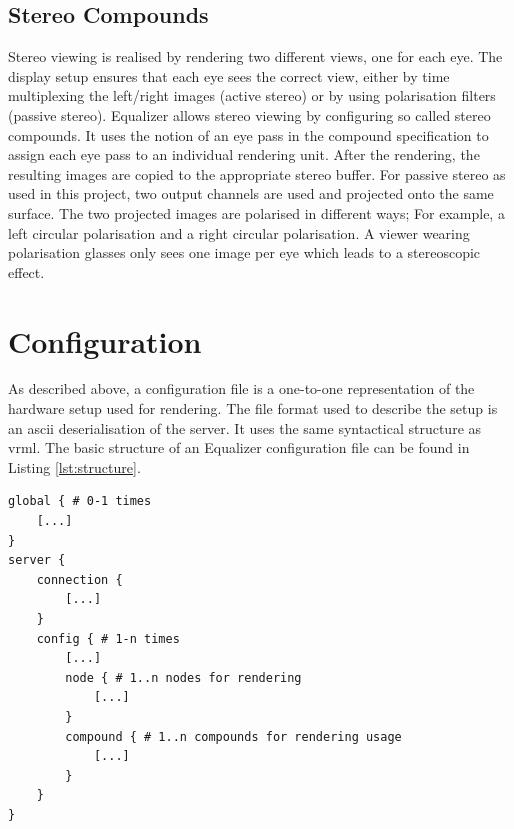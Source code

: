 \subsection{Stereo Compounds}
Stereo viewing is realised by rendering two different views, one for each eye. The display setup ensures that each eye sees the correct view, either by time multiplexing the left/right images (active stereo) or by using polarisation filters (passive stereo). Equalizer allows stereo viewing by configuring so called stereo compounds. It uses the notion of an eye pass in the compound specification to assign each eye pass to an individual rendering unit. After the rendering, the resulting images are copied to the appropriate stereo buffer.
For passive stereo as used in this project, two output channels are used and projected onto the same surface. The two projected images are polarised in different ways; For example, a left circular polarisation and a right circular polarisation. A viewer wearing polarisation glasses only sees one image per eye which leads to a stereoscopic effect.

\section{Configuration}
As described above, a configuration file is a one-to-one representation of the hardware setup used for rendering. The file format used to describe the setup is an \gls{ascii} deserialisation of the server. It uses the same syntactical structure as \gls{vrml}. The basic structure of an Equalizer configuration file can be found in Listing \ref{lst:structure}.

\begin{lstlisting}[language=vrml,caption={Basic structure of Equalizer configuration files},label={lst:structure}]
global { # 0-1 times
	[...]
}
server { 
	connection {
		[...]		
	}
	config { # 1-n times
		[...]
		node { # 1..n nodes for rendering
			[...]
		}
		compound { # 1..n compounds for rendering usage
			[...]
		}
	}
}

\end{lstlisting}

